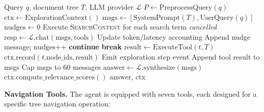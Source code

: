 \documentclass[conference]{IEEEtran}
\begin{document}
\begin{algorithm}[t]
\caption{Agent Exploration Loop}
\label{alg:agentloop}
\begin{algorithmic}[1]
\REQUIRE Query $q$, document tree $T$, LLM provider $\mathcal{L}$
\STATE $P \leftarrow \text{PreprocessQuery}(q)$ 
\STATE $\text{ctx} \leftarrow \text{ExplorationContext}()$
\STATE $\text{msgs} \leftarrow [\text{SystemPrompt}(T), \text{UserQuery}(q)]$
\STATE $\text{nudges} \leftarrow 0$
    \STATE Execute \textsc{SearchContent} for each search term
\ENDIF
{}
        \RETURN \textit{cancelled}
    \ENDIF
    \STATE $\text{resp} \leftarrow \mathcal{L}.\text{chat}(\text{msgs}, \text{tools})$
    \STATE Update token/latency accounting
            \STATE Append nudge message; $\text{nudges}$++
            \STATE \textbf{continue}
        \ELSE
            \STATE \textbf{break} 
        \ENDIF
    \ENDIF
        \STATE $\text{result} \leftarrow \text{ExecuteTool}(t, T)$
        \STATE $\text{ctx.record}(t.\text{node\_ids}, \text{result})$
        \STATE Emit exploration step event
        \STATE Append tool result to msgs
    \ENDFOR
    \STATE Cap msgs to 60 messages
\ENDFOR
\STATE $\text{answer} \leftarrow \mathcal{L}.\text{synthesize}(\text{msgs})$
\STATE $\text{ctx.compute\_relevance\_scores}()$
\RETURN $\text{answer}$, $\text{ctx}$
\end{algorithmic}
\end{algorithm}

\textbf{Navigation Tools.} The agent is equipped with seven tools, each designed for a specific tree navigation operation:
\end{document}
